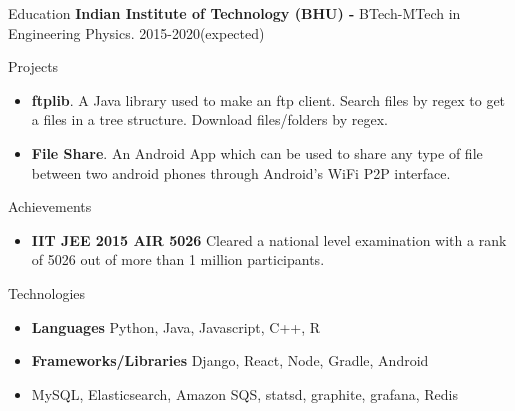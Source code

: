 \documentclass[]{mcdowellcv}
\begin{document}
	\begin{cvsection}{Education}
		\vspace*{2mm}
		\hspace*{2mm} \textbf{Indian Institute of Technology (BHU) - } BTech-MTech in Engineering Physics. 2015-2020(expected)
	\end{cvsection}
	\vspace*{5mm}
	\begin{cvsection}{Projects}
\vspace*{2mm}
		\begin{cvsubsection}{}{}{}
			\begin{itemize}
				\item \textbf{ftplib}. A Java library used to make an ftp client. Search files by regex to get a files in a tree structure. Download files/folders by regex.
				\item \textbf{File Share}. An Android App which can be used to share any type of file between two android phones through Android’s WiFi P2P interface.
			\end{itemize}
		\end{cvsubsection}
	\end{cvsection}
	\vspace*{5mm}
	\begin{cvsection}{Achievements}
\vspace*{2mm}
		\begin{cvsubsection}{}{}{}	
			\begin{itemize}
				\item \textbf{IIT JEE 2015 AIR 5026} Cleared a national level examination with a rank of 5026 out of more than 1 million participants.
			\end{itemize}
		\end{cvsubsection}
	\end{cvsection}
	\vspace*{5mm}
	\begin{cvsection}{Technologies}
\vspace*{2mm}
		\begin{cvsubsection}{}{}{}	
			\begin{itemize}
				\item \textbf{Languages} Python, Java, Javascript, C++, R
				\item \textbf{Frameworks/Libraries} Django, React, Node, Gradle, Android
				\item MySQL, Elasticsearch, Amazon SQS, statsd, graphite, grafana, Redis
			\end{itemize}
		\end{cvsubsection}
	\end{cvsection}
	
\end{document}
